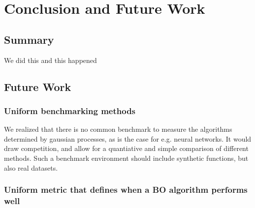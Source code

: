 \chapter{Conclusion and Future Work}

\ifpdf
    \graphicspath{{Chapter7/Figs/Raster/}{Chapter7/Figs/PDF/}{Chapter7/Figs/}}
\else
    \graphicspath{{Chapter7/Figs/Vector/}{Chapter7/Figs/}}
\fi

\section{Summary}
We did this and this happened

\section{Future Work}

\subsection{Uniform benchmarking methods}
We realized that there is no common benchmark to measure the algorithms determined by gaussian processes, as is the case for e.g. neural networks. 
It would draw competition, and allow for a quantiative and simple comparison of different methods.
Such a benchmark environment should include synthetic functions, but also real datasets.

\subsection{Uniform metric that defines when a BO algorithm performs well}


